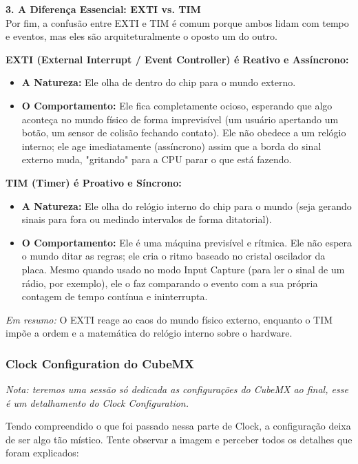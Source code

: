 \documentclass[12pt,a4paper]{article}
\begin{document}
\vspace{0.3cm}
\noindent\textbf{3. A Diferença Essencial: EXTI vs. TIM}\\
Por fim, a confusão entre EXTI e TIM é comum porque ambos lidam com tempo e eventos, mas eles são arquiteturalmente o oposto um do outro.

\textbf{EXTI (External Interrupt / Event Controller) é Reativo e Assíncrono:}
\begin{itemize}
    \item \textbf{A Natureza:} Ele olha de dentro do chip para o mundo externo.
    \item \textbf{O Comportamento:} Ele fica completamente ocioso, esperando que algo aconteça no mundo físico de forma imprevisível (um usuário apertando um botão, um sensor de colisão fechando contato). Ele não obedece a um relógio interno; ele age imediatamente (assíncrono) assim que a borda do sinal externo muda, "gritando" para a CPU parar o que está fazendo.
\end{itemize}

\textbf{TIM (Timer) é Proativo e Síncrono:}
\begin{itemize}
    \item \textbf{A Natureza:} Ele olha do relógio interno do chip para o mundo (seja gerando sinais para fora ou medindo intervalos de forma ditatorial).
    \item \textbf{O Comportamento:} Ele é uma máquina previsível e rítmica. Ele não espera o mundo ditar as regras; ele cria o ritmo baseado no cristal oscilador da placa. Mesmo quando usado no modo Input Capture (para ler o sinal de um rádio, por exemplo), ele o faz comparando o evento com a sua própria contagem de tempo contínua e ininterrupta.
\end{itemize}

\textit{Em resumo:} O EXTI reage ao caos do mundo físico externo, enquanto o TIM impõe a ordem e a matemática do relógio interno sobre o hardware.

\subsubsection{Clock Configuration do CubeMX}
\textit{Nota: teremos uma sessão só dedicada as configurações do CubeMX ao final, esse é um detalhamento do Clock Configuration.}

Tendo compreendido o que foi passado nessa parte de Clock, a configuração deixa de ser algo tão místico. Tente observar a imagem e perceber todos os detalhes que foram explicados:
\end{document}
